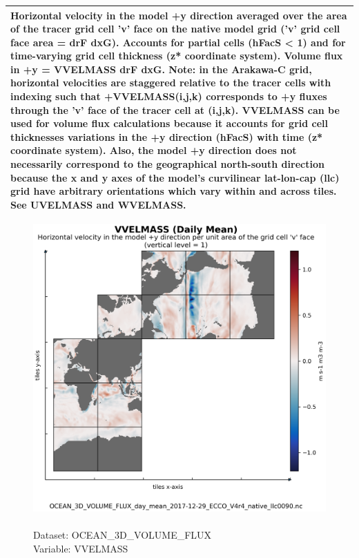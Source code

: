 \begin{longtable}{|p{}|p{}|p{}|p{}|}
\multicolumn{4}{|p{1\textwidth}|}{Horizontal velocity in the model +y direction averaged over the area of the tracer grid cell 'v' face on the native model grid ('v' grid cell face area = drF dxG). Accounts for partial cells (hFacS < 1) and for time-varying grid cell thickness (z* coordinate system). Volume flux in +y = VVELMASS drF dxG. Note: in the Arakawa-C grid, horizontal velocities are staggered relative to the tracer cells with indexing such that +VVELMASS(i,j,k) corresponds to +y fluxes through the 'v' face of the tracer cell at (i,j,k). VVELMASS can be used for volume flux calculations because it accounts for grid cell thicknesses variations in the +y direction (hFacS) with time (z* coordinate system). Also, the model +y direction does not necessarily correspond to the geographical north-south direction because the x and y axes of the model's curvilinear lat-lon-cap (llc) grid have arbitrary orientations which vary within and across tiles. See UVELMASS and WVELMASS.} \\ \hline
\end{longtable}

\begin{figure}[H]
\centering
\includegraphics[scale=0.5]{../images/plots/native_plots/Ocean_Three-Dimensional_Volume_Fluxes/VVELMASS.png}
\caption{\\Dataset: OCEAN\_3D\_VOLUME\_FLUX\\Variable: VVELMASS}
\label{tab:table-OCEAN_3D_VOLUME_FLUX_VVELMASS-Plot}
\end{figure}
\pagebreak
